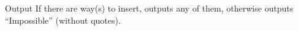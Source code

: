 Output
If there are way(s) to insert, outputs any of them, otherwise outputs “Impossible” (without quotes).
